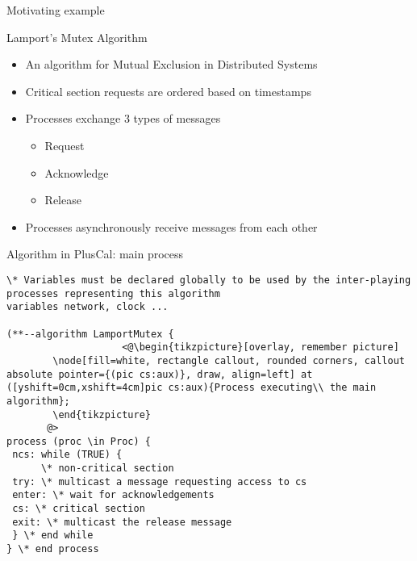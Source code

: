 \documentclass{beamer}
\begin{document}
\begin{frame}[fragile]{Motivating example}

\begin{block}{Lamport's Mutex Algorithm}
\begin{itemize}
  \item An algorithm for Mutual Exclusion in Distributed Systems
  \item Critical section requests are ordered based on timestamps
  \item Processes exchange 3 types of messages
  \begin{itemize} 
        \item Request
        \item Acknowledge
        \item Release
    \end{itemize}
   \item Processes asynchronously receive messages from each other
\end{itemize}
\end{block}
\end{frame}

\begin{frame}[fragile]{Algorithm in PlusCal: main process}
\begin{exampleblock}{}
\begin{lstlisting}[language=pluscal, frame = none, numbers = none]
\* Variables must be declared globally to be used by the inter-playing processes representing this algorithm
variables network, clock ...

(**--algorithm LamportMutex {
                    <@\begin{tikzpicture}[overlay, remember picture]
        \node[fill=white, rectangle callout, rounded corners, callout absolute pointer={(pic cs:aux)}, draw, align=left] at ([yshift=0cm,xshift=4cm]pic cs:aux){Process executing\\ the main algorithm};
        \end{tikzpicture}
       @>
process (proc \in Proc) {
 ncs: while (TRUE) {
      \* non-critical section
 try: \* multicast a message requesting access to cs
 enter: \* wait for acknowledgements 
 cs: \* critical section
 exit: \* multicast the release message
 } \* end while
} \* end process
\end{lstlisting}
\end{exampleblock}
\end{frame}
\end{document}
